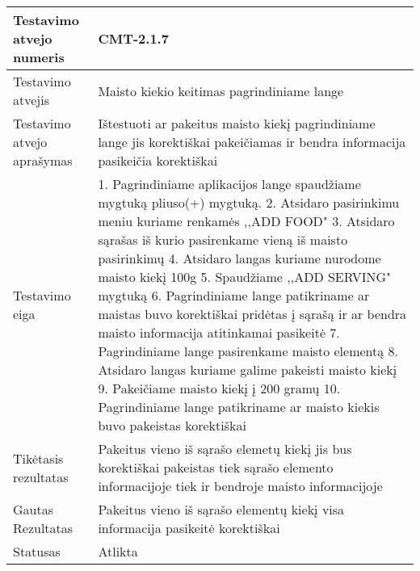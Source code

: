 \documentclass[oneside]{VUMIFPSkursinis}
\begin{document}
\begin{center}
    \begin{tabular}{ |p{5cm}|p{13cm}|}
    \hline
        Testavimo atvejo numeris & CMT-2.1.7  \\ \hline
        Testavimo atvejis & Maisto kiekio keitimas pagrindiniame lange \\ \hline
        Testavimo atvejo aprašymas & Ištestuoti ar pakeitus maisto kiekį pagrindiniame lange jis korektiškai pakeičiamas ir bendra informacija pasikeičia korektiškai \\ \hline
        Testavimo eiga &  1. Pagrindiniame aplikacijos lange spaudžiame mygtuką pliuso(+) mygtuką. 
				2. Atsidaro pasirinkimu meniu kuriame renkamės ,,ADD FOOD"
				3. Atsidaro sąrašas iš kurio pasirenkame vieną iš maisto pasirinkimų
				4. Atsidaro langas kuriame nurodome maisto kiekį 100g
				5. Spaudžiame ,,ADD SERVING"  mygtuką
				6. Pagrindiniame lange patikriname ar maistas buvo korektiškai pridėtas į sąrašą ir ar bendra maisto informacija atitinkamai pasikeitė
				7. Pagrindiniame lange pasirenkame maisto elementą
				8. Atsidaro langas kuriame galime pakeisti maisto kiekį
				9. Pakeičiame maisto kiekį į 200 gramų
				10. Pagrindiniame lange patikriname ar maisto kiekis buvo pakeistas korektiškai \\ \hline
        Tikėtasis rezultatas &  Pakeitus vieno iš sąrašo elemetų kiekį jis bus korektiškai pakeistas tiek sąrašo elemento informacijoje tiek ir bendroje maisto informacijoje \\ \hline
        Gautas Rezultatas & Pakeitus vieno iš sąrašo elementų kiekį visa informacija pasikeitė korektiškai \\ \hline
        Statusas &  Atlikta\\ \hline
    \hline
    \end{tabular}
\end{center}


\iffalse XXXXXXXXXXXXXXXXXXXXXXXXXXXXXXXXXXXXXXXXXXXXXXXXXXXXXXXXXXXXXXXXXXXXXXXXXXXXXXXXXXXXXXXXXXXXXXXXXXXXXXXXXXXXXXXXXXXXXXXXXXXXXXXXXXXXXXX \fi
\end{document}

